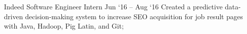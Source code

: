 \experience
    {Indeed}
    {Software Engineer Intern}
    {Jun `16 -- Aug `16}
    {
        Created a predictive data-driven decision-making system to increase SEO acquisition for job
        result pages with Java, Hadoop, Pig Latin, and Git;
    }
